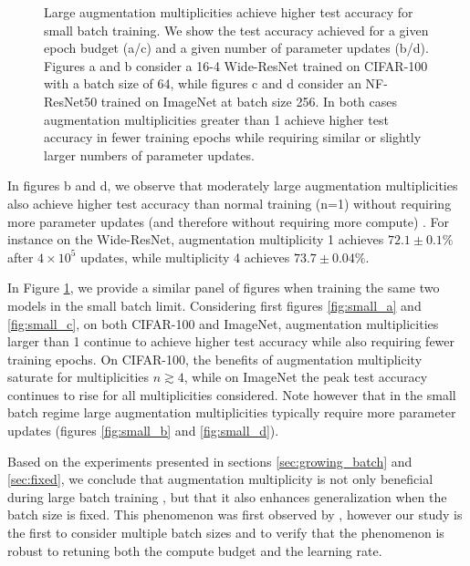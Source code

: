 \documentclass{article}
\begin{document}
\begin{figure}[t]
\centering
  \vskip -1mm
\vskip -2mm
\caption{Large augmentation multiplicities achieve higher test accuracy for small batch training. We show the test accuracy achieved for a given epoch budget (a/c) and a given number of parameter updates (b/d). Figures a and b consider a 16-4 Wide-ResNet trained on CIFAR-100 with a batch size of 64, while figures  c and d consider an NF-ResNet50 trained on ImageNet at batch size 256. In both cases augmentation multiplicities greater than 1 achieve higher test accuracy in fewer training epochs while requiring similar or slightly larger numbers of parameter updates.
}
\label{fig:small}
\vskip -2mm
\end{figure}


In figures b and d, we observe that moderately large augmentation multiplicities also achieve higher test accuracy than normal training (n=1) without requiring more parameter updates (and therefore without requiring more compute) \citep{berman2019multigrain}. For instance on the Wide-ResNet, augmentation multiplicity 1 achieves $72.1 \pm 0.1\%$ after $4\times 10^5$ updates, while multiplicity 4 achieves $73.7 \pm 0.04\%$.

In Figure \ref{fig:small}, we provide a similar panel of figures when training the same two models in the small batch limit. Considering first figures \ref{fig:small_a} and \ref{fig:small_c}, on both CIFAR-100 and ImageNet, augmentation multiplicities larger than 1 continue to achieve higher test accuracy while also requiring fewer training epochs. On CIFAR-100, the benefits of augmentation multiplicity saturate for multiplicities $n \gtrsim 4$, while on ImageNet the peak test accuracy continues to rise for all multiplicities considered. Note however that in the small batch regime large augmentation multiplicities typically require more parameter updates (figures \ref{fig:small_b} and \ref{fig:small_d}). 

Based on the experiments presented in sections \ref{sec:growing_batch} and \ref{sec:fixed}, we conclude that augmentation multiplicity is not only beneficial during large batch training \citep{hoffer2019augment}, but that it also enhances generalization when the batch size is fixed. This phenomenon was first observed by \citet{berman2019multigrain}, however our study is the first to consider multiple batch sizes and to verify that the phenomenon is robust to retuning both the compute budget and the learning rate.
\end{document}
